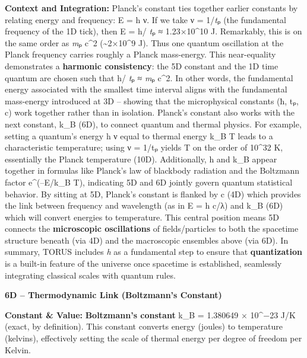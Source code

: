 \documentclass[
]{article}
\begin{document}
\textbf{Context and Integration:} Planck's constant ties together
earlier constants by relating energy and frequency: E = h ν. If we take
ν = 1/\emph{t}ₚ (the fundamental frequency of the 1D tick), then E = h/
\emph{t}ₚ ≈ 1.23×10\^{}10 J\hspace{0pt}. Remarkably, this is on the same
order as \emph{m}ₚ c\^{}2 (\textasciitilde2×10\^{}9 J)\hspace{0pt}. Thus
one quantum oscillation at the Planck frequency carries roughly a Planck
mass-energy. This near-equality demonstrates a \textbf{harmonic
consistency}: the 5D constant and the 1D time quantum are chosen such
that h/ \emph{t}ₚ ≈ \emph{m}ₚ c\^{}2\hspace{0pt}. In other words, the
fundamental energy associated with the smallest time interval aligns
with the fundamental mass-energy introduced at 3D -- showing that the
microphysical constants (ħ, tₚ, c) work together rather than in
isolation. Planck's constant also works with the next constant, k\_B
(6D), to connect quantum and thermal physics. For example, setting a
quantum's energy h ν equal to thermal energy k\_B T leads to a
characteristic temperature; using ν = 1/tₚ yields T on the order of
10\^{}32 K, essentially the Planck temperature (10D)\hspace{0pt}.
Additionally, h and k\_B appear together in formulas like Planck's law
of blackbody radiation and the Boltzmann factor e\^{}(--E/k\_B T),
indicating 5D and 6D jointly govern quantum statistical behavior. By
sitting at 5D, Planck's constant is flanked by c (4D) which provides the
link between frequency and wavelength (as in E = h c/λ) and k\_B (6D)
which will convert energies to temperature\hspace{0pt}. This central
position means 5D connects the \textbf{microscopic oscillations} of
fields/particles to both the spacetime structure beneath (via 4D) and
the macroscopic ensembles above (via 6D). In summary, TORUS includes
\emph{h} as a fundamental step to ensure that \textbf{quantization} is a
built-in feature of the universe once spacetime is established,
seamlessly integrating classical scales with quantum rules.

\textbf{6D -- Thermodynamic Link (Boltzmann's Constant)}

\textbf{Constant \& Value:} \textbf{Boltzmann's constant} k\_B =
1.380649 × 10\^{}−23 J/K (exact, by definition)\hspace{0pt}. This
constant converts energy (joules) to temperature (kelvins), effectively
setting the scale of thermal energy per degree of freedom per Kelvin.
\end{document}
